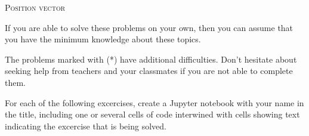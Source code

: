 \documentclass[11pt, a4paper, twoside]{article}
\begin{document}
\begin{center}
	\textsc{\large Position vector}
\end{center}

If you are able to solve these problems on your own, then you can assume that you have the minimum knowledge about these topics. 

\noindent
The problems marked with (*) have additional difficulties. Don't hesitate about seeking help from teachers and your classmates if you are not able to complete them.
		
\noindent
For each of the following excercises, create a Jupyter notebook with your name in the title, including one or several cells of code interwined with cells showing text indicating the excercise that is being solved.

\begin{enumerate}
	

\end{enumerate}
\end{document}
